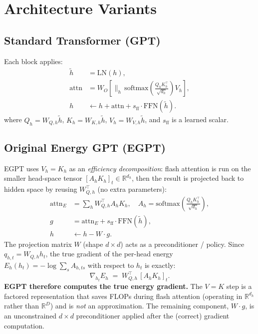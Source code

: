 \section{Architecture Variants}
\label{sec:architectures}

\subsection{Standard Transformer (GPT)}

Each block applies:
\begin{align}
  \tilde{h} &= \mathrm{LN}(h), \label{eq:ln} \\
  \mathrm{attn} &= W_O \left[ \|_h\, \mathrm{softmax}\!\left(\tfrac{Q_h K_h^\top}{\sqrt{d_h}}\right) V_h \right], \\
  h &\leftarrow h + \mathrm{attn} + s_{\mathrm{ff}} \cdot \mathrm{FFN}(\tilde{h}). \label{eq:gpt_update}
\end{align}
where $Q_h = W_{Q,h}\tilde{h}$, $K_h = W_{K,h}\tilde{h}$, $V_h = W_{V,h}\tilde{h}$,
and $s_{\mathrm{ff}}$ is a learned scalar.

\subsection{Original Energy GPT (EGPT)}

EGPT uses $V_h{=}K_h$ as an \emph{efficiency decomposition}: flash attention is run on the
smaller head-space tensor $[A_h K_h]_t \in \mathbb{R}^{d_h}$, then the result is projected
back to hidden space by reusing $W_{Q,h}^\top$ (no extra parameters):
\begin{align}
  \mathrm{attn}_E &= \sum_h W_{Q,h}^\top A_h K_h, \quad A_h = \mathrm{softmax}\!\left(\tfrac{Q_h K_h^\top}{\sqrt{d_h}}\right), \\
  g &= \mathrm{attn}_E + s_{\mathrm{ff}} \cdot \mathrm{FFN}(\tilde{h}), \\
  h &\leftarrow h - W \cdot g. \label{eq:egpt_update}
\end{align}
The projection matrix $W$ (shape $d \times d$) acts as a preconditioner / policy.
Since $q_{h,t} = W_{Q,h} h_t$, the true gradient of the per-head energy
$E_h(h_t) = -\log\!\sum_s A_{h,ts}$ with respect to $h_t$ is exactly:
\begin{equation}
  \nabla_{h_t} E_h \;=\; W_{Q,h}^\top \,[A_h K_h]_t .
\end{equation}
\textbf{EGPT therefore computes the true energy gradient.}
The $V{=}K$ step is a factored representation that saves FLOPs during flash attention
(operating in $\mathbb{R}^{d_h}$ rather than $\mathbb{R}^{D}$) and is \emph{not} an
approximation.  The remaining component, $W \cdot g$, is an unconstrained $d{\times}d$
preconditioner applied after the (correct) gradient computation.

